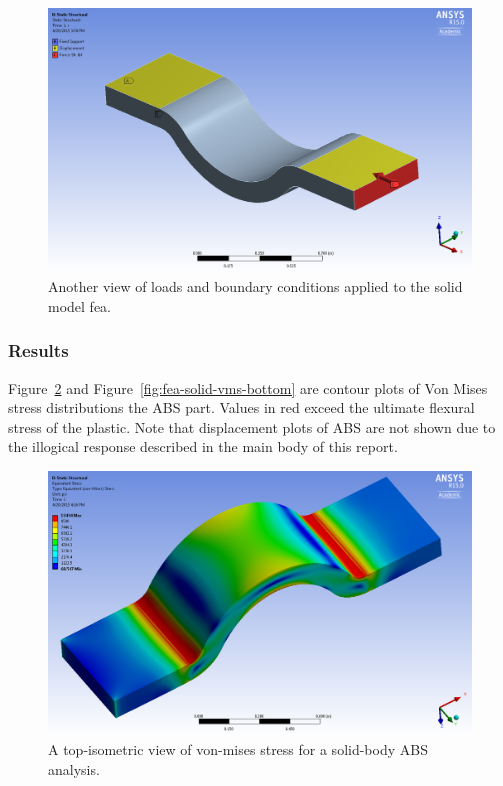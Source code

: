 \begin{figure}[htp]
\centering
\includegraphics[width=1\textwidth]{./figures/fea/fea-solid-loads-bcs-3}
\caption{Another view of loads and boundary conditions applied to the solid model fea.}
\label{fig:fea-solid-loads-bcs-3}
\end{figure}

\clearpage

\subsubsection{Results}


\indent

Figure~\ref{fig:fea-solid-vms-top} and Figure~\ref{fig:fea-solid-vms-bottom} are contour plots of Von Mises stress distributions the ABS part. Values in red exceed the ultimate flexural stress of the plastic. Note that displacement plots of ABS are not shown due to the illogical response described in the main body of this report.\\

\begin{figure}[htp]
\centering
\includegraphics[width=1\textwidth]{./figures/fea/fea-solid-vms-top}
\caption{A top-isometric view of von-mises stress for a solid-body ABS analysis.}
\label{fig:fea-solid-vms-top}
\end{figure}

